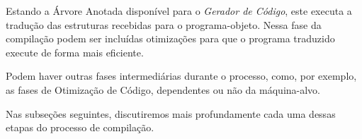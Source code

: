 Estando a Árvore Anotada disponível para o \emph{Gerador de Código}, este
executa a tradução das estruturas recebidas para o programa-objeto. Nessa fase
da compilação podem ser incluídas otimizações para que o programa traduzido
execute de forma mais eficiente.

Podem haver outras fases intermediárias durante o processo, como, por exemplo,
as fases de Otimização de Código, dependentes ou não da máquina-alvo.

Nas subseções seguintes, discutiremos mais profundamente cada uma dessas etapas
do processo de compilação.





